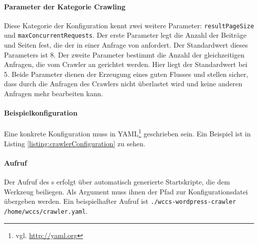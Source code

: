     \paragraph*{Parameter der Kategorie Crawling}
    Diese Kategorie der Konfiguration kennt zwei weitere Parameter:
    \texttt{resultPageSize} und \texttt{maxConcurrentRequests}.
    Der erste Parameter legt die Anzahl der Beiträge und Seiten fest,
    die der {\wordpressCrawler} in einer Anfrage von {\wordpress} anfordert.
    Der Standardwert dieses Parameters ist 8.
    Der zweite Parameter bestimmt die Anzahl der gleichzeitigen Anfragen,
    die vom Crawler an {\wordpress} gerichtet werden.
    Hier liegt der Standardwert bei 5.
    Beide Parameter dienen der Erzeugung eines guten Flusses und stellen sicher,
    dass {\wordpress} durch die Anfragen des Crawlers
    nicht überlastet wird und keine anderen Anfragen mehr bearbeiten kann.

    \paragraph*{Beispielkonfiguration}
    Eine konkrete Konfiguration muss in YAML\footnote{vgl. \url{http://yaml.org}} geschrieben sein.
    Ein Beispiel ist in Listing \ref{listing:crawlerConfiguration} zu sehen.

    

    \paragraph*{Aufruf}
    Der Aufruf des {\wordpressCrawler}s erfolgt über automatisch generierte Startskripte,
    die dem Werkzeug beiliegen.
    Als Argument muss ihnen der Pfad zur Konfigurationsdatei übergeben werden.
    Ein beispielhafter Aufruf ist \texttt{./wccs-wordpress-crawler /home/wccs/crawler.yaml}.
